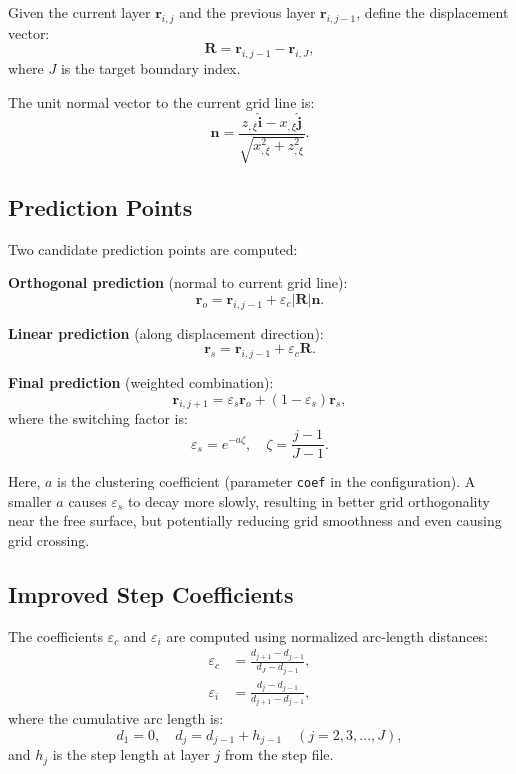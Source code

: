 \documentclass[11pt,a4paper]{report}
\newcommand{\rvec}{\bm{r}}
\newcommand{\nvec}{\bm{n}}
\begin{document}
Given the current layer $\rvec_{i,j}$ and the previous layer $\rvec_{i,j-1}$, define the displacement vector:
\begin{equation}
    \bm{R} = \rvec_{i,j-1} - \rvec_{i,J},
\end{equation}
where $J$ is the target boundary index.

The unit normal vector to the current grid line is:
\begin{equation}
    \nvec = \frac{z_{,\xi} \hat{\bm{i}} - x_{,\xi} \hat{\bm{j}}}{\sqrt{x_{,\xi}^2 + z_{,\xi}^2}}.
\end{equation}

\subsection{Prediction Points}

Two candidate prediction points are computed:

\textbf{Orthogonal prediction} (normal to current grid line):
\begin{equation}
    \rvec_o = \rvec_{i,j-1} + \varepsilon_c |\bm{R}| \nvec.
\end{equation}

\textbf{Linear prediction} (along displacement direction):
\begin{equation}
    \rvec_s = \rvec_{i,j-1} + \varepsilon_c \bm{R}.
\end{equation}

\textbf{Final prediction} (weighted combination):
\begin{equation}
    \rvec_{i,j+1} = \varepsilon_s \rvec_o + (1 - \varepsilon_s) \rvec_s,
\end{equation}
where the switching factor is:
\begin{equation}
    \varepsilon_s = e^{-a\zeta}, \quad \zeta = \frac{j-1}{J-1}.
\end{equation}

Here, $a$ is the clustering coefficient (parameter \texttt{coef} in the configuration). A smaller $a$ causes $\varepsilon_s$ to decay more slowly, resulting in better grid orthogonality near the free surface, but potentially reducing grid smoothness and even causing grid crossing.

\subsection{Improved Step Coefficients}

The coefficients $\varepsilon_c$ and $\varepsilon_i$ are computed using normalized arc-length distances:
\begin{equation}
\begin{aligned}
    \varepsilon_c &= \frac{d_{j+1} - d_{j-1}}{d_J - d_{j-1}}, \\
    \varepsilon_i &= \frac{d_j - d_{j-1}}{d_{j+1} - d_{j-1}},
\end{aligned}
\end{equation}
where the cumulative arc length is:
\begin{equation}
    d_1 = 0, \quad d_j = d_{j-1} + h_{j-1} \quad (j = 2, 3, \ldots, J),
\end{equation}
and $h_j$ is the step length at layer $j$ from the step file.
\end{document}
